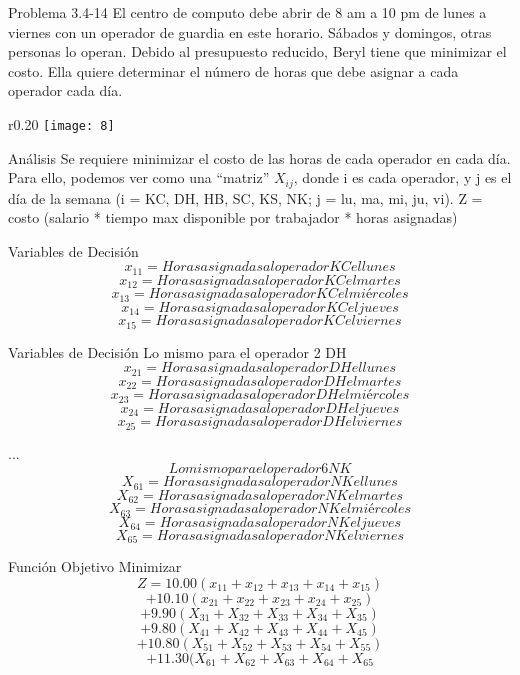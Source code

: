 \documentclass{beamer}
\begin{document}
\begin{frame}[t,fragile]{Problema 3.4-14 }
El centro de computo debe abrir de 8 am a 10 pm de lunes a viernes con un operador de guardia en este horario. Sábados y domingos, otras personas lo operan. Debido al presupuesto reducido, Beryl tiene que minimizar el costo. Ella quiere determinar el número de horas que debe asignar a cada operador cada día. \begin{wrapfigure}{r}{0.20\textwidth}
    \centering
    \texttt{[image: 8]}
\end{wrapfigure}

\end{frame}
\begin{frame}{Análisis}
Se requiere minimizar el costo  de las horas de cada operador en cada día. 
Para ello, podemos ver como una “matriz” \(X_{ij}\), donde  i es cada operador, y j es el día de la semana (i = KC, DH, HB, SC, KS, NK;  j = lu, ma, mi, ju, vi).
Z = costo (salario * tiempo max disponible por trabajador * horas asignadas)

\end{frame}

\begin{frame}[fragile]{Variables de Decisión}
\[x_{11} =  Horas asignadas al operador KC el lunes\]
\[x_{12} = Horas asignadas al operador KC el martes\]
\[x_{13} =  Horas asignadas al operador KC el miércoles\]
\[x_{14}   = Horas asignadas al operador KC el jueves\]
\[x_{15} =  Horas asignadas al operador KC el viernes\]
\end{frame}
\begin{frame}[fragile]{Variables de Decisión}
Lo mismo para  el operador 2 DH\\
\[x_{21} =  Horas asignadas al operador DH el lunes\]
\[x_{22} = Horas asignadas al operador DH el martes\]
\[x_{23} =  Horas asignadas al operador DH el miércoles\]
\[x_{24} = Horas asignadas al operador DH el jueves\]
\[x_{25} =  Horas asignadas al operador DH el viernes\]

...\\
\[Lo mismo para el operador 6 NK\]
\[X_{61} =  Horas asignadas al operador NK el lunes\]
\[X_{62} = Horas asignadas al operador NK el martes\]
\[X_{63} =  Horas asignadas al operador NK el miércoles\]
\[X_{64} = Horas asignadas al operador NK el jueves\]
\[X_{65} =  Horas asignadas al operador NK el viernes\]


\end{frame}

\begin{frame}[fragile]{Función Objetivo}
Minimizar
\[Z = 10.00 (x_{11} + x_{12} +x_{13}+x_{14} +x_{15}) \]
\[+ 10.10 (x_{21} + x_{22} +x_{23}+x_{24} + x_{25})\]
\[+  9.90 (X_{31} + X_{32} +X_{33}+X_{34} +X_{35})\]
\[+ 9.80  (X_{41} + X_{42} +X_{43}+X_{44} +X_{45})\]
\[+ 10.80  (X_{51} + X_{52} +X_{53}+X_{54} +X_{55})\]
\[+ 11.30  (X_{61} + X_{62} +X_{63}+X_{64} +X_{65}\]

\end{frame}
\end{document}
